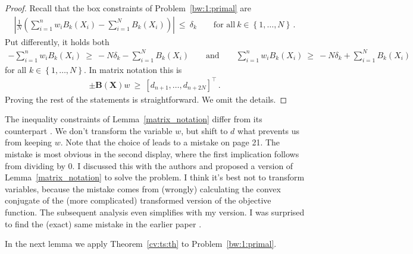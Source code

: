 \begin{proof}
  Recall that the box constraints of Problem~\ref{bw:1:primal} are
  \begin{gather*}
        \left| 
      \frac{1}{N} 
      \left( 
      \sum_{i = 1}^{n} 
      w_i
      B_k(X_i)
      -
      \sum_{i=1}^{N} 
      B_k(X_i)
      \right)
    \right|
    \ 
    \le 
    \ 
    \delta_k
    \qquad
    \text{for all}\ 
    k\in \left\{ 1,\ldots, N \right\}
    \,.
  \end{gather*}
  Put differently, it holds both
  \begin{align*}
    -
      \sum_{i = 1}^{n} 
      w_i
      B_k(X_i)
      \ 
    \ge 
      \ 
    -
    N
    \delta_k
      -
      \sum_{i=1}^{N} 
      B_k(X_i)
      \qquad 
    \text{and}
      \qquad
      \sum_{i = 1}^{n} 
      w_i
      B_k(X_i)
      \ 
    \ge 
      \ 
    -
    N
    \delta_k
      +
      \sum_{i=1}^{N} 
      B_k(X_i)
  \end{align*}
  for all 
  $
    k\in \left\{ 1,\ldots, N \right\}
  $. In matrix notation this is 
  \begin{gather*}
    \pm\mathbf{B}(\mathbf{X})w
    \ 
    \ge
    \ 
    [d_{n+1},\ldots, d_{n+  2 N}]^\top
    \,.
  \end{gather*}
  Proving the rest of the statements is straightforward. We omit the details.
\end{proof}
\begin{remark}
  The inequality constraints of
  Lemma~\ref{matrix_notation} differ from its counterpart
  \cite[Proof of Lemma~1]{Wang2019}.
  We don't transform the variable $w$, but shift to $d$ what prevents us from keeping $w$.
  Note that the choice of
  \cite[Proof of Lemma~1]{Wang2019} leads to a mistake on page 21.
  The mistake is most obvious in the second display, where the first implication follows from dividing by 0.
  I discussed this with the authors and proposed a version of Lemma~\ref{matrix_notation} to solve the problem. I think it's best not to transform variables, because the mistake comes from (wrongly) calculating the convex conjugate of the (more complicated) transformed version of the objective function. The subsequent analysis even simplifies with my version.
  I was surprised to find the (exact) same mistake in the earlier paper 
  \cite[page 35 second display]{Chan2016}. 
\end{remark}
%
In the next lemma we apply Theorem~\ref{cv:ts:th} to Problem~\ref{bw:1:primal}.
%

